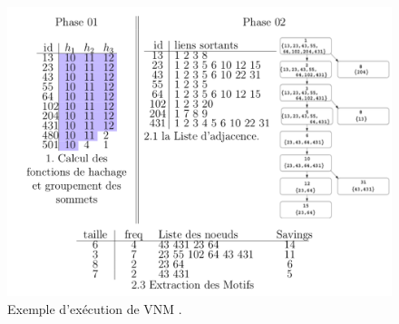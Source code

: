 		
			\begin{figure}[!h]
			\centering
			\includegraphics[scale=0.4,center]{./ressources/image/VNM_exemple.png}
			\caption[Exemple d'exécution de VNM .]{Exemple d'exécution de VNM \citep{buehrer2008scalable}.}
			\label{VNM_exemple}
	\end{figure}